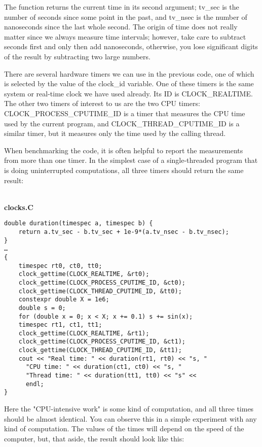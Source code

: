 The function returns the current time in its second argument; tv\_sec is the number of seconds since some point in the past, and tv\_nsec is the number of nanoseconds since the last whole second. The origin of time does not really matter since we always measure time intervals; however, take care to subtract seconds first and only then add nanoseconds, otherwise, you lose significant digits of the result by subtracting two large numbers.

There are several hardware timers we can use in the previous code, one of which is selected by the value of the clock\_id variable. One of these timers is the same system or real-time clock we have used already. Its ID is CLOCK\_REALTIME. The other two timers of interest to us are the two CPU timers: CLOCK\_PROCESS\_CPUTIME\_ID is a timer that measures the CPU time used by the current program, and CLOCK\_THREAD\_CPUTIME\_ID is a similar timer, but it measures only the time used by the calling thread.

When benchmarking the code, it is often helpful to report the measurements from more than one timer. In the simplest case of a single-threaded program that is doing uninterrupted computations, all three timers should return the same result:

\hspace*{\fill} \\ %
\noindent
\textbf{clocks.C}
\begin{lstlisting}[style=styleCXX]
double duration(timespec a, timespec b) {
	return a.tv_sec - b.tv_sec + 1e-9*(a.tv_nsec - b.tv_nsec);
}
…
{
	timespec rt0, ct0, tt0;
	clock_gettime(CLOCK_REALTIME, &rt0);
	clock_gettime(CLOCK_PROCESS_CPUTIME_ID, &ct0);
	clock_gettime(CLOCK_THREAD_CPUTIME_ID, &tt0);
	constexpr double X = 1e6;
	double s = 0;
	for (double x = 0; x < X; x += 0.1) s += sin(x);
	timespec rt1, ct1, tt1;
	clock_gettime(CLOCK_REALTIME, &rt1);
	clock_gettime(CLOCK_PROCESS_CPUTIME_ID, &ct1);
	clock_gettime(CLOCK_THREAD_CPUTIME_ID, &tt1);
	cout << "Real time: " << duration(rt1, rt0) << "s, "
	  "CPU time: " << duration(ct1, ct0) << "s, "
	  "Thread time: " << duration(tt1, tt0) << "s" <<
	  endl;
}
\end{lstlisting}

Here the "CPU-intensive work" is some kind of computation, and all three times should be almost identical. You can observe this in a simple experiment with any kind of computation. The values of the times will depend on the speed of the computer, but, that aside, the result should look like this:

